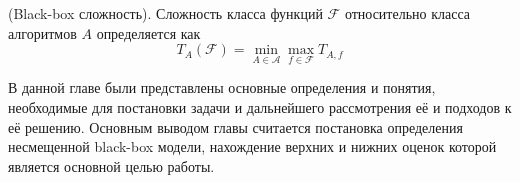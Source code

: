 \begin{definition}
(Black-box сложность). 
Сложность класса функций $\mathcal{F}$ относительно класса алгоритмов $A$ определяется как
$$T_{A}(\mathcal{F}) = \min_{A \in \mathcal{A}} \max_{f \in \mathcal{F}} T_{A, f} $$
\end{definition}



\chapterconclusion
В данной главе были представлены основные определения и понятия, необходимые для постановки задачи и дальнейшего рассмотрения её и подходов к её решению. Основным выводом главы считается постановка определения несмещенной black-box модели, нахождение верхних и нижних оценок которой является основной целью работы.   
